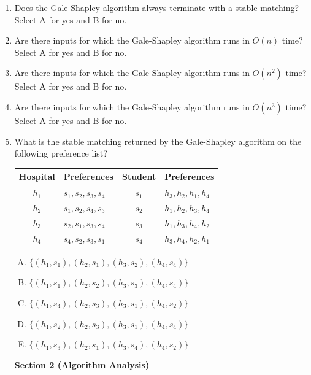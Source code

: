\documentclass[11pt]{article}
\begin{document}
\begin{enumerate}
\item Does the Gale-Shapley algorithm always terminate with a stable matching?
Select A for yes and B for no.

\item Are there inputs for which the Gale-Shapley algorithm runs in $O(n)$ time?
Select A for yes and B for no.

\item Are there inputs for which the Gale-Shapley algorithm runs in $O(n^2)$ time?
Select A for yes and B for no.

\item Are there inputs for which the Gale-Shapley algorithm runs in $O(n^3)$ time?
Select A for yes and B for no.

\item What is the stable matching returned by the Gale-Shapley algorithm on the
following preference list?

\begin{table}[h]
\centering
\begin{tabular}{c | l || c | l}
\textbf{Hospital} & \textbf{Preferences} & \textbf{Student} & \textbf{Preferences} \\
\hline
$h_1$ & $s_1 , s_2 , s_3 , s_4$ & $s_1$ & $h_3 , h_2 , h_1 , h_4$ \\
$h_2$ & $s_1 , s_2 , s_4 , s_3$ & $s_2$ & $h_1 , h_2 , h_3 , h_4$ \\
$h_3$ & $s_2 , s_1 , s_3 , s_4$ & $s_3$ & $h_1 , h_3 , h_4 , h_2$ \\
$h_4$ & $s_4 , s_2 , s_3 , s_1$ & $s_4$ & $h_3 , h_4 , h_2 , h_1$ \\
\end{tabular}
\end{table}

\begin{enumerate}[A.]
    \item $\{(h_1, s_1), (h_2, s_1), (h_3, s_2), (h_4, s_4)\}$
    \item $\{(h_1, s_1), (h_2, s_2), (h_3, s_3), (h_4, s_4)\}$
    \item $\{(h_1, s_4), (h_2, s_3), (h_3, s_1), (h_4, s_2)\}$
    \item $\{(h_1, s_2), (h_2, s_3), (h_3, s_1), (h_4, s_4)\}$
    \item $\{(h_1, s_3), (h_2, s_1), (h_3, s_4), (h_4, s_2)\}$
\end{enumerate}
\newpage

\begin{center}
\LARGE\textbf{Section 2 (Algorithm Analysis)\\}%
\end{center}


\end{enumerate}
\end{document}
